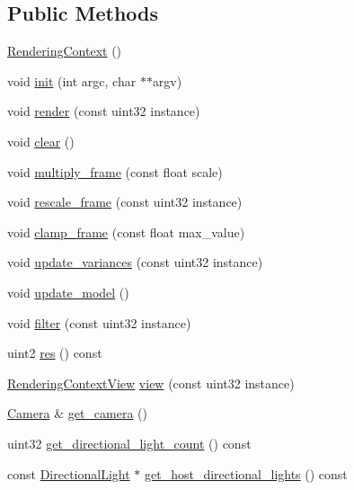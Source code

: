 \subsection*{Public Methods}
\begin{DoxyCompactItemize}
\item 
\hyperlink{struct_rendering_context_ad72f8d3fcbef9e5d47243962667b783d}{Rendering\+Context} ()
\item 
void \hyperlink{struct_rendering_context_a5ca766a70c2def1699f2ed6fa1f8bccd}{init} (int argc, char $\ast$$\ast$argv)
\item 
void \hyperlink{struct_rendering_context_a2cdc9b5c263a871ec466e60b9e215c6d}{render} (const uint32 instance)
\item 
void \hyperlink{struct_rendering_context_ac2b7bdb2a0291e653e19fc6ea1e40974}{clear} ()
\item 
void \hyperlink{struct_rendering_context_a332a91e18bd96ae06973cc897c34ff07}{multiply\+\_\+frame} (const float scale)
\item 
void \hyperlink{struct_rendering_context_a6fb940a3b78a8a3faf82676c95ab1e6f}{rescale\+\_\+frame} (const uint32 instance)
\item 
void \hyperlink{struct_rendering_context_a922edc5d94bd8501da3096b649cd1231}{clamp\+\_\+frame} (const float max\+\_\+value)
\item 
void \hyperlink{struct_rendering_context_a1dc21b9ad58b2192a2ec472c96d7e4b0}{update\+\_\+variances} (const uint32 instance)
\item 
void \hyperlink{struct_rendering_context_a2f523381e2f5cc25cc96af6d80ab60be}{update\+\_\+model} ()
\item 
void \hyperlink{struct_rendering_context_a7dc602302bd972f8e72e57ca2ca01e44}{filter} (const uint32 instance)
\item 
uint2 \hyperlink{struct_rendering_context_ad1a58510bdaf6f373080835abf5db2db}{res} () const
\item 
\hyperlink{struct_rendering_context_view}{Rendering\+Context\+View} \hyperlink{struct_rendering_context_a591062fd1887b069a015ede456dcaa93}{view} (const uint32 instance)
\item 
\hyperlink{struct_camera}{Camera} \& \hyperlink{struct_rendering_context_aa23f799fc75e822740e23cbe4ffabc64}{get\+\_\+camera} ()
\item 
uint32 \hyperlink{struct_rendering_context_a773203fe86f8d0b987d614beba38e332}{get\+\_\+directional\+\_\+light\+\_\+count} () const
\item 
const \hyperlink{struct_directional_light}{Directional\+Light} $\ast$ \hyperlink{struct_rendering_context_a6ebafbfb94c8a674519afe1b9f907901}{get\+\_\+host\+\_\+directional\+\_\+lights} () const
$$
\end{DoxyCompactItemize}
